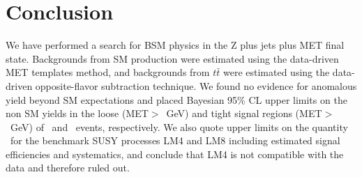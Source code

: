 \section{Conclusion}
\label{sec:conclusion}

We have performed a search for BSM physics in the Z plus jets plus MET final state.
Backgrounds from SM \Z production were estimated using the data-driven
MET templates method, and backgrounds from $t\bar{t}$ were estimated using
the data-driven opposite-flavor subtraction technique. We found no evidence
for anomalous yield beyond SM expectations and placed Bayesian 95\% CL upper limits
on the non SM yields in the loose (MET$>$\signalmetl~GeV) and tight signal regions (MET$>$\signalmett~GeV)
of \ulloose~and \ultight~events, respectively. 
We also quote upper limits on the quantity
\sta\ for the
benchmark SUSY processes LM4 and LM8
including estimated signal efficiencies and systematics, 
and conclude that LM4 is not compatible with the data and therefore ruled out.
